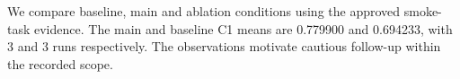 We compare baseline, main and ablation conditions using the approved smoke-task evidence. The main and baseline C1 means are 0.779900 and 0.694233, with 3 and 3 runs respectively. The observations motivate cautious follow-up within the recorded scope.
